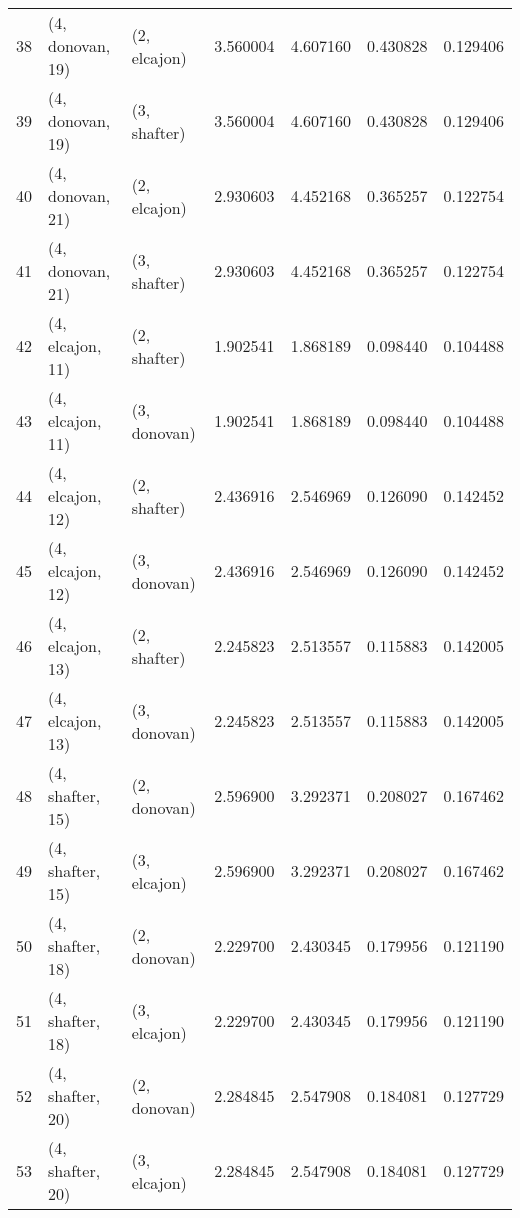 \begin{tabular}{lllrrrr}
38 &  (4, donovan, 19) &     (2, elcajon) &  3.560004 &  4.607160 &   0.430828 &  0.129406 \\
39 &  (4, donovan, 19) &     (3, shafter) &  3.560004 &  4.607160 &   0.430828 &  0.129406 \\
40 &  (4, donovan, 21) &     (2, elcajon) &  2.930603 &  4.452168 &   0.365257 &  0.122754 \\
41 &  (4, donovan, 21) &     (3, shafter) &  2.930603 &  4.452168 &   0.365257 &  0.122754 \\
42 &  (4, elcajon, 11) &     (2, shafter) &  1.902541 &  1.868189 &   0.098440 &  0.104488 \\
43 &  (4, elcajon, 11) &     (3, donovan) &  1.902541 &  1.868189 &   0.098440 &  0.104488 \\
44 &  (4, elcajon, 12) &     (2, shafter) &  2.436916 &  2.546969 &   0.126090 &  0.142452 \\
45 &  (4, elcajon, 12) &     (3, donovan) &  2.436916 &  2.546969 &   0.126090 &  0.142452 \\
46 &  (4, elcajon, 13) &     (2, shafter) &  2.245823 &  2.513557 &   0.115883 &  0.142005 \\
47 &  (4, elcajon, 13) &     (3, donovan) &  2.245823 &  2.513557 &   0.115883 &  0.142005 \\
48 &  (4, shafter, 15) &     (2, donovan) &  2.596900 &  3.292371 &   0.208027 &  0.167462 \\
49 &  (4, shafter, 15) &     (3, elcajon) &  2.596900 &  3.292371 &   0.208027 &  0.167462 \\
50 &  (4, shafter, 18) &     (2, donovan) &  2.229700 &  2.430345 &   0.179956 &  0.121190 \\
51 &  (4, shafter, 18) &     (3, elcajon) &  2.229700 &  2.430345 &   0.179956 &  0.121190 \\
52 &  (4, shafter, 20) &     (2, donovan) &  2.284845 &  2.547908 &   0.184081 &  0.127729 \\
53 &  (4, shafter, 20) &     (3, elcajon) &  2.284845 &  2.547908 &   0.184081 &  0.127729 \\
\bottomrule
\end{tabular}
